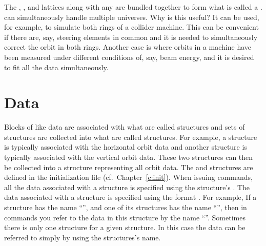 The , , and  lattices along with any
 are bundled together to form what is called a
. \tao can simultaneously handle multiple universes. Why
is this useful? It can be used, for example, to simulate both rings of
a collider machine. This can be convenient if there are, say, steering
elements in common and it is needed to simultaneously correct the
orbit in both rings. Another case is where orbits in a machine have
been measured under different conditions of, say, beam energy, and it
is desired to fit all the data simultaneously.

\section{Data}

Blocks of like data are associated with what are called 
structures and sets of  structures are collected into what
are called  structures. For example, a 
structure is typically associated with the horizontal orbit data and
another  structure is typically associated with the
vertical orbit data. These two structures can then be collected into a
 structure representing all orbit data. The 
and  structures are defined in the \tao initialization
file (cf.~Chapter~\ref{c:init}).  When issuing \tao commands, all the
data associated with a  structure is specified using the
 structure's .  The data associated with a
 structure is specified using the format
. For example, If a  structure has the
name ``'', and one of its  structures has the name
``'', then in \tao commands you refer to the data in this
 structure by the name ``''. Sometimes there is
only one  structure for a given  structure. In
this case the data can be referred to simply by using the
 structures's name.

